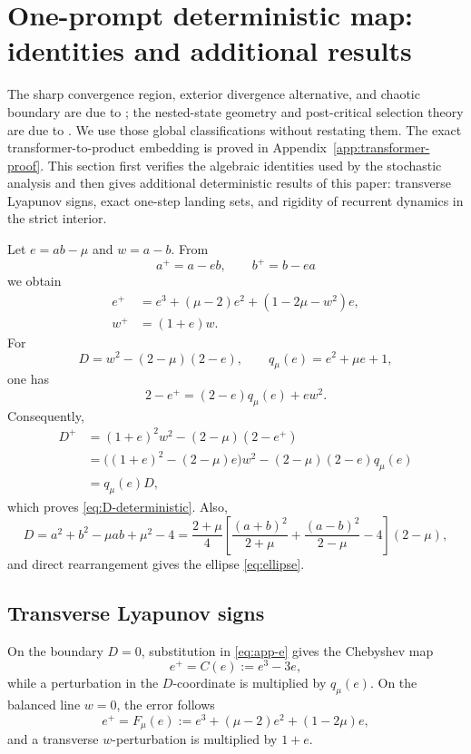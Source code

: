 \documentclass[11pt]{article}
\begin{document}
\section{One-prompt deterministic map: identities and additional results}
\label{app:deterministic}

The sharp convergence region, exterior divergence alternative, and chaotic
boundary are due to \citet{liang2026gradient}; the nested-state geometry and
post-critical selection theory are due to \citet{moon2026state}.  We use
those global classifications without restating them.  The exact
transformer-to-product embedding is proved in
Appendix~\ref{app:transformer-proof}.  This section first verifies the
algebraic identities used by the stochastic analysis and then gives
additional deterministic results of this paper: transverse Lyapunov signs,
exact one-step landing sets, and rigidity of recurrent dynamics in the
strict interior.

Let \(e=ab-\mu\) and \(w=a-b\).  From
\[
a^+=a-eb,\qquad b^+=b-ea
\]
we obtain
\begin{align}
e^+
&=e^3+(\mu-2)e^2+(1-2\mu-w^2)e,\label{eq:app-e}\\
w^+&=(1+e)w.\label{eq:app-w}
\end{align}
For
\[
D=w^2-(2-\mu)(2-e),
\qquad
q_\mu(e)=e^2+\mu e+1,
\]
one has
\[
2-e^+=(2-e)q_\mu(e)+ew^2.
\]
Consequently,
\begin{align*}
D^+
&=(1+e)^2w^2-(2-\mu)(2-e^+)\\
&=\bigl((1+e)^2-(2-\mu)e\bigr)w^2
 -(2-\mu)(2-e)q_\mu(e)\\
&=q_\mu(e)D,
\end{align*}
which proves \eqref{eq:D-deterministic}.  Also,
\[
D
=a^2+b^2-\mu ab+\mu^2-4
=\frac{2+\mu}{4}
\left[
\frac{(a+b)^2}{2+\mu}
+\frac{(a-b)^2}{2-\mu}
-4
\right](2-\mu),
\]
and direct rearrangement gives the ellipse \eqref{eq:ellipse}.

\subsection{Transverse Lyapunov signs}

On the boundary \(D=0\), substitution in \eqref{eq:app-e} gives the
Chebyshev map
\begin{equation}
\label{eq:app-chebyshev-map}
    e^+=C(e):=e^3-3e,
\end{equation}
while a perturbation in the \(D\)-coordinate is multiplied by
\(q_\mu(e)\).  On the balanced line \(w=0\), the error follows
\begin{equation}
\label{eq:app-balanced-map}
    e^+=F_\mu(e):=
    e^3+(\mu-2)e^2+(1-2\mu)e,
\end{equation}
and a transverse \(w\)-perturbation is multiplied by \(1+e\).
\end{document}
